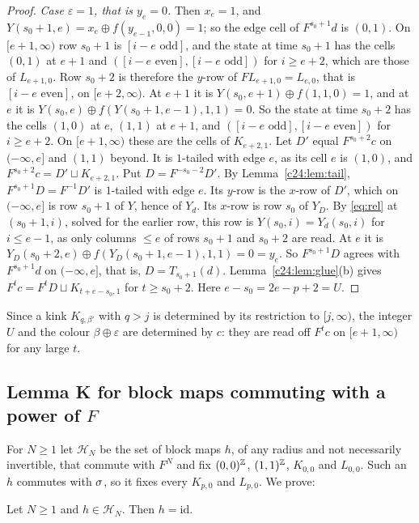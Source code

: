 \begin{proof}
\emph{Case $\varepsilon=1$, that is $y_e=0$.} Then $x_e=1$, and $Y(s_0+1,e)=x_e\oplus f(y_{e-1},0,0)=1$; so the edge cell of $F^{s_0+1}d$ is $(0,1)$. On $[e+1,\infty)$ row $s_0+1$ is $[i-e\text{ odd}]$, and the state at time $s_0+1$ has the cells $(0,1)$ at $e+1$ and $([i-e\text{ even}],[i-e\text{ odd}])$ for $i\ge e+2$, which are those of $L_{e+1,0}$. Row $s_0+2$ is therefore the $y$-row of $FL_{e+1,0}=L_{e,0}$, that is $[i-e\text{ even}]$, on $[e+2,\infty)$. At $e+1$ it is $Y(s_0,e+1)\oplus f(1,1,0)=1$, and at $e$ it is $Y(s_0,e)\oplus f(Y(s_0+1,e-1),1,1)=0$. So the state at time $s_0+2$ has the cells $(1,0)$ at $e$, $(1,1)$ at $e+1$, and $([i-e\text{ odd}],[i-e\text{ even}])$ for $i\ge e+2$. On $[e+1,\infty)$ these are the cells of $K_{e+2,1}$. Let $D'$ equal $F^{s_0+2}c$ on $(-\infty,e]$ and $(1,1)$ beyond. It is $1$-tailed with edge $e$, as its cell $e$ is $(1,0)$, and $F^{s_0+2}c=D'\sqcup K_{e+2,1}$. Put $D=F^{-s_0-2}D'$. By Lemma~\ref{c24:lem:tail}, $F^{s_0+1}D=F^{-1}D'$ is $1$-tailed with edge $e$. Its $y$-row is the $x$-row of $D'$, which on $(-\infty,e]$ is row $s_0+1$ of $Y$, hence of $Y_d$. Its $x$-row is row $s_0$ of $Y_D$. By \eqref{eq:rel} at $(s_0+1,i)$, solved for the earlier row, this row is $Y(s_0,i)=Y_d(s_0,i)$ for $i\le e-1$, as only columns $\le e$ of rows $s_0+1$ and $s_0+2$ are read. At $e$ it is $Y_D(s_0+2,e)\oplus f(Y_D(s_0+1,e-1),1,1)=0=y_e$. So $F^{s_0+1}D$ agrees with $F^{s_0+1}d$ on $(-\infty,e]$, that is, $D=T_{s_0+1}(d)$. Lemma~\ref{c24:lem:glue}(b) gives $F^tc=F^tD\sqcup K_{t+e-s_0,1}$ for $t\ge s_0+2$. Here $e-s_0=2e-p+2=U$.
\end{proof}

Since a kink $K_{q,\beta'}$ with $q>j$ is determined by its restriction to $[j,\infty)$, the integer $U$ and the colour $\beta\oplus\varepsilon$ are determined by $c$: they are read off $F^tc$ on $[e+1,\infty)$ for any large $t$.

\subsection{Lemma K for block maps commuting with a power of \texorpdfstring{$F$}{F}}\label{c24:sec:K}

For $N\ge1$ let $\mathcal H_N$ be the set of block maps $h$, of any radius and not necessarily invertible, that commute with $F^N$ and fix $(0,0)^{\mathbb{Z}}$, $(1,1)^{\mathbb{Z}}$, $K_{0,0}$ and $L_{0,0}$. Such an $h$ commutes with $\sigma$, so it fixes every $K_{p,0}$ and $L_{p,0}$. We prove:

\begin{lemma}[Lemma K$'$]\label{c24:lem:Kprime}
Let $N\ge1$ and $h\in\mathcal H_N$. Then $h=\mathrm{id}$.
\end{lemma}


